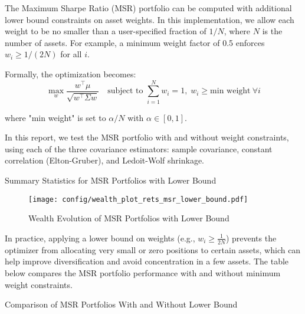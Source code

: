 \documentclass{article}
\begin{document}
The Maximum Sharpe Ratio (MSR) portfolio can be computed with additional lower bound constraints on asset weights. In this implementation, we allow each weight to be no smaller than a user-specified fraction of $1/N$, where $N$ is the number of assets. For example, a minimum weight factor of 0.5 enforces $w_i \geq 1/(2N)$ for all $i$.

Formally, the optimization becomes:
\[
\max_{w} \frac{w^\top \mu}{\sqrt{w^\top \Sigma w}}
\quad \text{subject to } \sum_{i=1}^N w_i = 1,\; w_i \geq \text{min weight} \ \forall i
\]

where "min weight" is set to $\alpha / N$ with $\alpha \in [0,1]$.

In this report, we test the MSR portfolio with and without weight constraints, using each of the three covariance estimators: sample covariance, constant correlation (Elton-Gruber), and Ledoit-Wolf shrinkage.




\begin{table}[htbp]
\centering
\caption{Summary Statistics for MSR Portfolios with Lower Bound}
\label{tab:stats_msr_lb}
\begin{adjustbox}{max width=\textwidth}
    
\end{adjustbox}
\end{table}


\begin{figure}[htbp]
    \centering
    \texttt{[image: config/wealth\_plot\_rets\_msr\_lower\_bound.pdf]}
    \caption{Wealth Evolution of MSR Portfolios with Lower Bound}
    \label{fig:wealth_msr_lb}
\end{figure}

\newpage
\noindent
In practice, applying a lower bound on weights (e.g., \( w_i \geq \frac{1}{2N} \)) prevents the optimizer from allocating very small or zero positions to certain assets, which can help improve diversification and avoid concentration in a few assets. The table below compares the MSR portfolio performance with and without minimum weight constraints.

\begin{table}[htbp]
\centering
\caption{Comparison of MSR Portfolios With and Without Lower Bound}
\label{tab:stats_msr_vs}
\begin{adjustbox}{max width=\textwidth}
    
\end{adjustbox}
\end{table}
\end{document}
